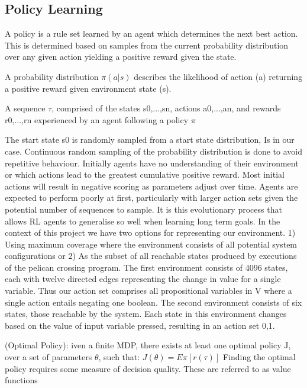 \documentclass[runningheads]{llncs}
\begin{document}
\subsection{Policy Learning}
A policy is a rule set learned by an agent which determines the next best action. This is determined based on samples from the current probability distribution over any given action yielding a positive reward given the state.

\begin{definition}[Policy]A probability distribution $\pi(a|s)$ describes the likelihood of action (a) returning a positive reward given environment state (s).
\end{definition}

\begin{definition}[Trajectory]
	A sequence $\tau$, comprised of the states s0,...,sn, actions
	a0,...,an, and rewards r0,...,rn experienced by an agent following a policy $\pi$
\end{definition}
The start state s0 is randomly sampled from a start state distribution, Is in our
case. Continuous random sampling of the probability distribution is done to avoid
repetitive behaviour. Initially agents have no understanding of their environment or
which actions lead to the greatest cumulative positive reward. Most initial actions will
result in negative scoring as parameters adjust over time. Agents are expected to perform
poorly at first, particularly with larger action sets given the potential number of sequences
to sample. It is this evolutionary process that allows RL agents to generalise so well
when learning long term goals.
In the context of this project we have two options for representing our environment.
1) Using maximum coverage where the environment consists of all potential system
configurations or 2) As the subset of all reachable states produced by executions of the
pelican crossing program. The first environment consists of 4096 states, each with twelve
directed edges representing the change in value for a single variable. Thus our action
set comprises all propositional variables in V where a single action entails negating
one boolean. The second environment consists of six states, those reachable by the
system. Each state in this environment changes based on the value of input variable
pressed, resulting in an action set {0,1}.

\begin{theorem}
	(Optimal Policy): iven a finite MDP, there exists at least one optimal
	policy J, over a set of parameters $\theta$, such that:
	$J(\theta) = E\pi[r(\tau)]$
	Finding the optimal policy requires some measure of decision quality. These are
	referred to as value functions
\end{theorem}
\end{document}
